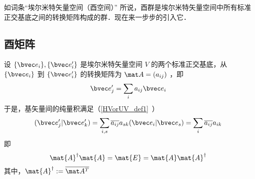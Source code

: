 
如词条“埃尔米特矢量空间（酉空间）” 所说，酉群是埃尔米特矢量空间中所有标准正交基底之间的转换矩阵构成的群．现在来一步步的引入它．
\subsection{酉矩阵}
设 $\{\bvec e_i\},\{\bvec e'_i\}$ 是埃尔米特矢量空间 $V$ 的两个标准正交基底，从 $\{\bvec e_i\}$ 到 $\{\bvec e'_i\}$ 的转换矩阵为 $\mat A=(a_{ij})$ ，即
\begin{equation}
\bvec e'_j=\sum_{i}a_{ij}\bvec e_i
\end{equation}
于是，基矢量间的纯量积满足（\autoref{HVorUV_def1}~）
\begin{equation}
(\bvec e'_j|\bvec e'_k)=\sum_{i,s}\overline{a_{ij}}a_{sk}(\bvec e_i|\bvec e_s)=\sum_{i}\overline{a_{ij}}a_{ik}
\end{equation}
即
\begin{equation}
\mat{A}^\dagger \mat{A}=\mat{E}=\mat{A} \mat{A}^\dagger
\end{equation}
其中，$\mat{A}^\dagger:=\overline{\mat A^T}$